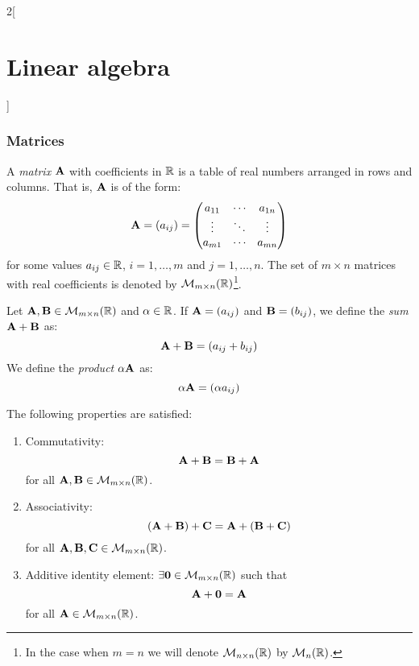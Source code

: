 \documentclass[../../../main.tex]{subfiles}
\begin{document}
\begin{multicols}{2}[\section{Linear algebra}]
  \subsubsection{Matrices}
  \begin{definition}[Matrix]
    A \emph{matrix} $\boldsymbol{\mathrm{A}}$ with coefficients in $\mathbb{R}$ is a table of real numbers arranged in rows and columns. That is, $\boldsymbol{\mathrm{A}}$ is of the form:
    \begin{equation*}
      \boldsymbol{\mathrm{A}}=(a_{ij})=
      \begin{pmatrix}
        a_{11} & \cdots & a_{1n} \\
        \vdots & \ddots & \vdots \\
        a_{m1} & \cdots & a_{mn}
      \end{pmatrix}
    \end{equation*}
    for some values $a_{ij}\in\mathbb{R}$, $i=1,\ldots,m$ and $j=1,\ldots,n$. The set of $m\times n$ matrices with real coefficients is denoted by $\mathcal{M}_{m\times n}(\mathbb{R})$\footnote{In the case when $m=n$ we will denote $\mathcal{M}_{n\times n}(\mathbb{R})$ by $\mathcal{M}_n(\mathbb{R})$.}.
  \end{definition}
  \begin{definition}
    Let $\boldsymbol{\mathrm{A}},\boldsymbol{\mathrm{B}}\in\mathcal{M}_{m\times n}(\mathbb{R})$ and $\alpha\in\mathbb{R}$. If $\boldsymbol{\mathrm{A}}=(a_{ij})$ and $\boldsymbol{\mathrm{B}}=(b_{ij})$, we define the \emph{sum} $\boldsymbol{\mathrm{A}}+\boldsymbol{\mathrm{B}}$ as: $$\boldsymbol{\mathrm{A}}+\boldsymbol{\mathrm{B}}=(a_{ij}+b_{ij})$$
    We define the \emph{product} $\alpha\boldsymbol{\mathrm{A}}$ as: $$\alpha\boldsymbol{\mathrm{A}}=(\alpha a_{ij})$$
  \end{definition}
  \begin{prop}
    The following properties are satisfied:
    \begin{enumerate}
      \item Commutativity: $$\boldsymbol{\mathrm{A}}+\boldsymbol{\mathrm{B}}=\boldsymbol{\mathrm{B}}+\boldsymbol{\mathrm{A}}$$ for all $\boldsymbol{\mathrm{A}},\boldsymbol{\mathrm{B}}\in\mathcal{M}_{m\times n}(\mathbb{R})$.
      \item Associativity: $$(\boldsymbol{\mathrm{A}}+\boldsymbol{\mathrm{B}})+\boldsymbol{\mathrm{C}}=\boldsymbol{\mathrm{A}}+(\boldsymbol{\mathrm{B}}+\boldsymbol{\mathrm{C}})$$ for all $\boldsymbol{\mathrm{A}},\boldsymbol{\mathrm{B}},\boldsymbol{\mathrm{C}}\in\mathcal{M}_{m\times n}(\mathbb{R})$.
      \item Additive identity element: $\exists\boldsymbol{\mathrm{0}}\in\mathcal{M}_{m\times n}(\mathbb{R})$ such that $$\boldsymbol{\mathrm{A}}+\boldsymbol{\mathrm{0}}=\boldsymbol{\mathrm{A}}$$ for all $\boldsymbol{\mathrm{A}}\in\mathcal{M}_{m\times n}(\mathbb{R})$.

\end{enumerate}
\end{prop}
\end{multicols}
\end{document}
